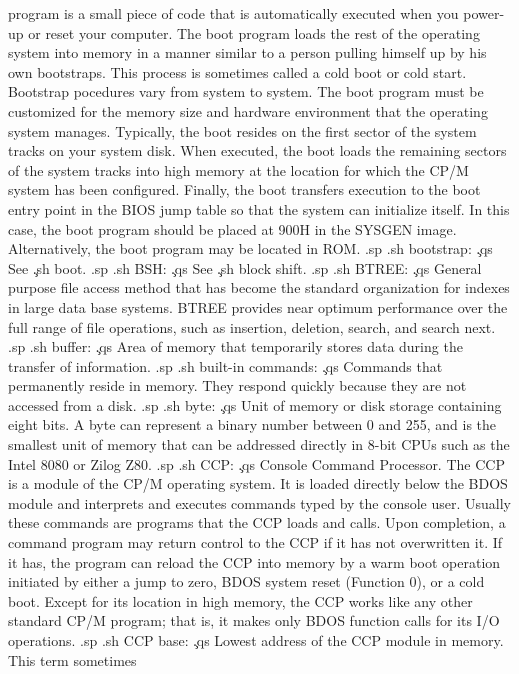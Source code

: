 program is a small piece of code that is automatically executed 
when you power-up or reset your computer.  The boot program loads 
the rest of the operating system into memory in a manner similar 
to a person pulling himself up by his own bootstraps.  This 
process is sometimes called a cold boot or cold start.  Bootstrap 
pocedures vary from system to system.  The boot program must be 
customized for the memory size and hardware environment that the 
operating system manages.  Typically, the boot resides on the 
first sector of the system tracks on your system disk.  When 
executed, the boot loads the remaining sectors of the system 
tracks into high memory at the location for which the CP/M system 
has been configured.  Finally, the boot transfers execution to 
the boot entry point in the BIOS jump table so that the system 
can initialize itself.  In this case, the boot program should be 
placed at 900H in the SYSGEN image.  Alternatively, the boot 
program may be located in ROM.
.sp
.sh
bootstrap:  \c
.qs
See \c
.sh
boot.
.sp
.sh
BSH:  \c
.qs
See \c
.sh
block shift.
.sp
.sh
BTREE:  \c
.qs
General purpose file access method that has become the standard 
organization for indexes in large data base systems.  BTREE 
provides near optimum performance over the full range of file 
operations, such as insertion, deletion, search, and search next.
.sp
.sh
buffer:  \c
.qs
Area of memory that temporarily stores data during the transfer 
of information.
.sp
.sh
built-in commands:  \c
.qs
Commands that permanently reside in memory.  They respond quickly 
because they are not accessed from a disk.
.sp
.sh
byte:  \c
.qs
Unit of memory or disk storage containing eight bits.  A byte can 
represent a binary number between 0 and 255, and is the smallest 
unit of memory that can be addressed directly in 8-bit CPUs such 
as the Intel 8080 or Zilog Z80.
.sp
.sh
CCP:  \c
.qs
Console Command Processor.  The CCP is a module of the CP/M 
operating system.  It is loaded directly below the BDOS module 
and interprets and executes commands typed by the console user.  
Usually these commands are programs that the CCP loads and calls.  
Upon completion, a command program may return control to the CCP 
if it has not overwritten it.  If it has, the program can reload 
the CCP into memory by a warm boot operation initiated by either 
a jump to zero, BDOS system reset (Function 0), or a cold boot.  
Except for its location in high memory, the CCP works like any 
other standard CP/M program; that is, it makes only BDOS function 
calls for its I/O operations.
.sp
.sh
CCP base:  \c
.qs
Lowest address of the CCP module in memory.  This term sometimes 
